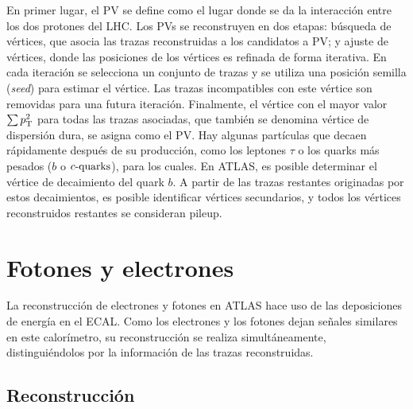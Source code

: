 En primer lugar, el \ac{PV} se define como el lugar donde se da la interacci\'on entre los dos protones del \ac{LHC}. Los \acp{PV} se reconstruyen en dos etapas: b\'usqueda de v\'ertices, que asocia las trazas reconstruidas a los candidatos a \ac{PV}; y ajuste de v\'ertices, donde las posiciones de los v\'ertices es refinada de forma iterativa. En cada iteraci\'on se selecciona un conjunto de trazas y se utiliza una posici\'on semilla (\textit{seed}) para estimar el v\'ertice. Las trazas incompatibles con este v\'ertice son removidas para una futura iteraci\'on.
Finalmente, el vértice con el mayor valor \(\sum p_{\text{T}}^2\) para todas las trazas asociadas, que tambi\'en se denomina vértice de dispersión dura, se asigna como el \ac{PV}.
Hay algunas partículas que decaen rápidamente despu\'es de su producción, como los leptones \(\tau\) o los quarks más pesados (\(b\) o \(c\text{-quarks}\)), para los cuales. En \ac{ATLAS}, es posible determinar el v\'ertice de decaimiento del quark \(b\). A partir de las trazas restantes originadas por estos decaimientos, es posible identificar vértices secundarios, y todos los vértices reconstruidos restantes se consideran pileup.








\section{Fotones y electrones}

La reconstrucción de electrones y fotones en \ac{ATLAS} hace uso de las deposiciones de energía en el \ac{ECAL}. Como los electrones y los fotones dejan señales similares en este calor\'imetro, su reconstrucción se realiza simultáneamente, distinguiéndolos por la información de las trazas reconstruidas.


\subsection{Reconstrucci\'on}
\label{subsec:objects:egamma:reco}

